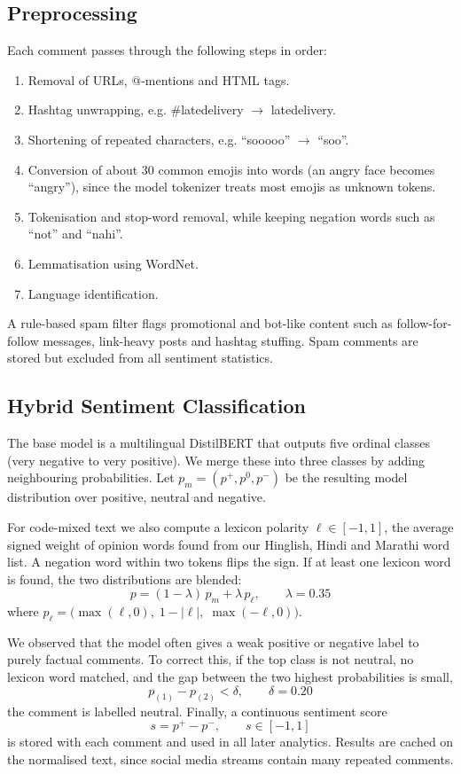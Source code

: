 \documentclass[conference]{IEEEtran}
\begin{document}
\subsection{Preprocessing}
Each comment passes through the following steps in order:
\begin{enumerate}
\item Removal of URLs, @-mentions and HTML tags.
\item Hashtag unwrapping, e.g. \#latedelivery $\rightarrow$ latedelivery.
\item Shortening of repeated characters, e.g. ``sooooo'' $\rightarrow$ ``soo''.
\item Conversion of about 30 common emojis into words (an angry face becomes ``angry''), since the
model tokenizer treats most emojis as unknown tokens.
\item Tokenisation and stop-word removal, while keeping negation words such as ``not'' and ``nahi''.
\item Lemmatisation using WordNet.
\item Language identification.
\end{enumerate}
A rule-based spam filter flags promotional and bot-like content such as follow-for-follow messages,
link-heavy posts and hashtag stuffing. Spam comments are stored but excluded from all sentiment
statistics.

\subsection{Hybrid Sentiment Classification}
The base model is a multilingual DistilBERT that outputs five ordinal classes (very negative to very
positive). We merge these into three classes by adding neighbouring probabilities. Let
$p_m = (p^+, p^0, p^-)$ be the resulting model distribution over positive, neutral and negative.

For code-mixed text we also compute a lexicon polarity $\ell \in [-1, 1]$, the average signed weight
of opinion words found from our Hinglish, Hindi and Marathi word list. A negation word within two
tokens flips the sign. If at least one lexicon word is found, the two distributions are blended:
\begin{equation}
p = (1 - \lambda)\, p_m + \lambda\, p_\ell, \qquad \lambda = 0.35
\end{equation}
where $p_\ell = \big(\max(\ell,0),\; 1 - |\ell|,\; \max(-\ell,0)\big)$.

We observed that the model often gives a weak positive or negative label to purely factual
comments. To correct this, if the top class is not neutral, no lexicon word matched, and the gap
between the two highest probabilities is small,
\begin{equation}
p_{(1)} - p_{(2)} < \delta, \qquad \delta = 0.20
\end{equation}
the comment is labelled neutral. Finally, a continuous sentiment score
\begin{equation}
s = p^+ - p^-, \qquad s \in [-1, 1]
\end{equation}
is stored with each comment and used in all later analytics. Results are cached on the normalised
text, since social media streams contain many repeated comments.
\end{document}
